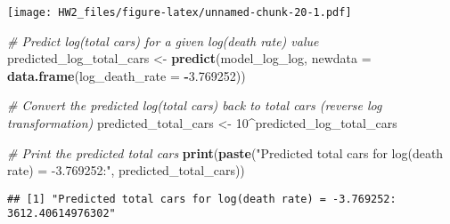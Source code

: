 \documentclass[
]{article}
\newenvironment{Shaded}{\begin{snugshade}}{\end{snugshade}}
\newcommand{\AttributeTok}[1]{\textcolor[rgb]{0.13,0.29,0.53}{#1}}
\newcommand{\CommentTok}[1]{\textcolor[rgb]{0.56,0.35,0.01}{\textit{#1}}}
\newcommand{\DecValTok}[1]{\textcolor[rgb]{0.00,0.00,0.81}{#1}}
\newcommand{\FloatTok}[1]{\textcolor[rgb]{0.00,0.00,0.81}{#1}}
\newcommand{\FunctionTok}[1]{\textcolor[rgb]{0.13,0.29,0.53}{\textbf{#1}}}
\newcommand{\NormalTok}[1]{#1}
\newcommand{\OtherTok}[1]{\textcolor[rgb]{0.56,0.35,0.01}{#1}}
\newcommand{\SpecialCharTok}[1]{\textcolor[rgb]{0.81,0.36,0.00}{\textbf{#1}}}
\newcommand{\StringTok}[1]{\textcolor[rgb]{0.31,0.60,0.02}{#1}}
\begin{document}
\texttt{[image: HW2\_files/figure-latex/unnamed-chunk-20-1.pdf]}

\begin{Shaded}
\begin{Highlighting}[]
\CommentTok{\# Predict log(total cars) for a given log(death rate) value}
\NormalTok{predicted\_log\_total\_cars }\OtherTok{\textless{}{-}} \FunctionTok{predict}\NormalTok{(model\_log\_log, }\AttributeTok{newdata =} \FunctionTok{data.frame}\NormalTok{(}\AttributeTok{log\_death\_rate =} \SpecialCharTok{{-}}\FloatTok{3.769252}\NormalTok{))}

\CommentTok{\# Convert the predicted log(total cars) back to total cars (reverse log transformation)}
\NormalTok{predicted\_total\_cars }\OtherTok{\textless{}{-}} \DecValTok{10}\SpecialCharTok{\^{}}\NormalTok{predicted\_log\_total\_cars}

\CommentTok{\# Print the predicted total cars}
\FunctionTok{print}\NormalTok{(}\FunctionTok{paste}\NormalTok{(}\StringTok{"Predicted total cars for log(death rate) = {-}3.769252:"}\NormalTok{, predicted\_total\_cars))}
\end{Highlighting}
\end{Shaded}

\begin{verbatim}
## [1] "Predicted total cars for log(death rate) = -3.769252: 3612.40614976302"
\end{verbatim}
\end{document}
